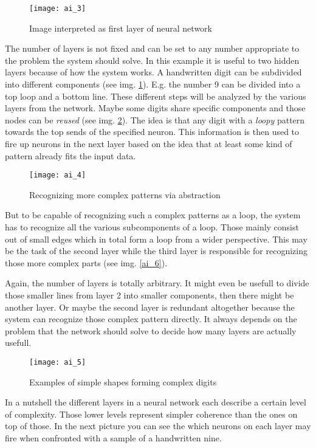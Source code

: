 \documentclass{article}
\begin{document}
\begin{figure}[h]
	\centering
	\texttt{[image: ai\_3]}
	\caption{Image interpreted as first layer of neural network}
	\label{ai_3}
\end{figure}

The number of layers is not fixed and can be set to any number appropriate to the problem the system should solve. In this example it is useful to two hidden layers because of how the system works. A handwritten digit can be subdivided into different components (see img. \ref{ai_3}). E.g. the number 9 can be divided into a top loop and a bottom line. These different steps will be analyzed by the various layers from the network. Maybe some digits share specific components and those nodes can be \textit{reused} (see img. \ref{ai_4}). The idea is that any digit with a \textit{loopy} pattern towards the top sends of the specified neuron. This information is then used to fire up neurons in the next layer based on the idea that at least some kind of pattern already fits the input data.

\begin{figure}[h]
	\centering
	\texttt{[image: ai\_4]}
	\caption{Recognizing more complex patterns via abstraction}
	\label{ai_4}
\end{figure}

But to be capable of recognizing such a complex patterns as a loop, the system has to recognize all the various subcomponents of a loop. Those mainly consist out of small edges which in total form a loop from a wider perspective. This may be the task of the second layer while the third layer is responsible for recognizing those more complex parts (see img. \ref{ai_6}). 

Again, the number of layers is totally arbitrary. It might even be usefull to divide those smaller lines from layer 2 into smaller components, then there might be another layer. Or maybe the second layer is redundant altogether because the system can recognize those complex pattern directly. It always depends on the problem that the network should solve to decide how many layers are actually usefull.

\begin{figure}[h]
	\centering
	\texttt{[image: ai\_5]}
	\caption{Examples of simple shapes forming complex digits}
	\label{ai_5}
\end{figure}

In a nutshell the different layers in a neural network each describe a certain level of complexity. Those lower levels represent simpler coherence than the ones on top of those. In the next picture you can see the which neurons on each layer may fire when confronted with a sample of a handwritten nine.
\end{document}
